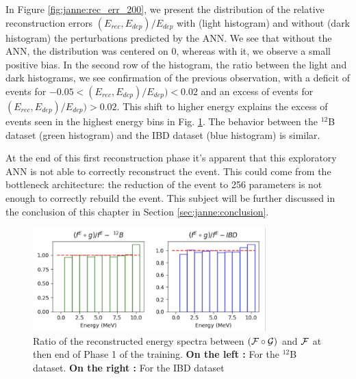 \documentclass[../main.tex]{subfiles}
\begin{document}
In Figure \ref{fig:janne:rec_err_200}, we present the distribution of the relative reconstruction errors $(E_{rec}, E_{dep})/E_{dep}$ with (light histogram) and without (dark histogram) the perturbations predicted by the ANN. We see that without the ANN, the distribution was centered on 0, whereas with it, we observe a small positive bias. In the second row of the histogram, the ratio between the light and dark histograms, we see confirmation of the previous observation, with a deficit of events for $-0.05 < (E_{rec}, E_{dep})/E_{dep}) < 0.02$ and an excess of events for $(E_{rec}, E_{dep})/E_{dep}) > 0.02$. This shift to higher energy explains the excess of events seen in the highest energy bins in Fig. \ref{fig:janne:f_circ_over_f_200}. The behavior between the $^{12}$B dataset (green histogram) and the IBD dataset (blue histogram) is similar.

At the end of this first reconstruction phase it's apparent that this exploratory ANN is not able to correctly reconstruct the event. This could come from the bottleneck architecture: the reduction of the event to 256 parameters is not enough to correctly rebuild the event. This subject will be further discussed in the conclusion of this chapter in Section \ref{sec:janne:conclusion}.

\begin{figure}[!ht]
  \centering
  \includegraphics[height=4cm]{images/janne/f_circ_over_f_200.png}
  \caption{Ratio of the reconstructed energy spectra between $({\cal F} \circ {\cal G})$ and ${\cal F}$ at then end of Phase 1 of the training. \textbf{On the left :} For the $^{12}$B dataset. \textbf{On the right :} For the IBD dataset}
  \label{fig:janne:f_circ_over_f_200}
\end{figure}
\end{document}
